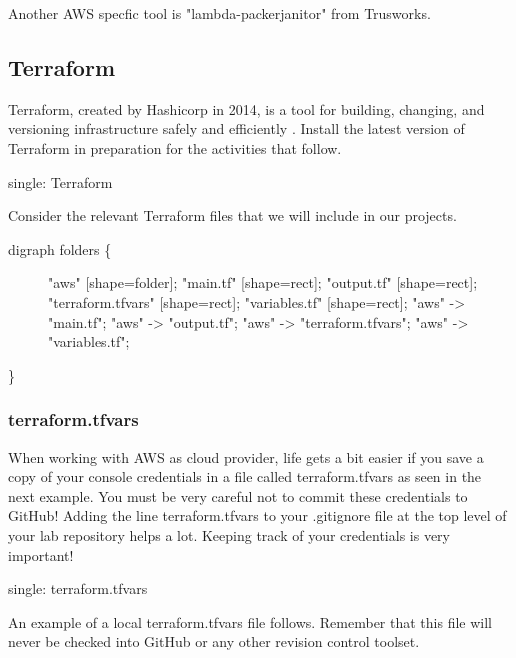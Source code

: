 Another AWS specfic tool is "lambda-packerjanitor" from Trusworks.

\hypertarget{terraform}{%
   \subsection{Terraform}\label{terraform}}

Terraform, created by Hashicorp in 2014, is a tool for building,
changing, and versioning infrastructure safely and efficiently . Install
the latest version of Terraform in preparation for the activities that
follow.

single: Terraform

Consider the relevant Terraform files that we will include in our
projects.

\begin{description}
   \item[digraph folders \{]
         "aws" {[}shape=folder{]}; "main.tf" {[}shape=rect{]}; "output.tf"
         {[}shape=rect{]}; "terraform.tfvars" {[}shape=rect{]}; "variables.tf"
         {[}shape=rect{]}; "aws" -\textgreater{} "main.tf"; "aws" -\textgreater{}
         "output.tf"; "aws" -\textgreater{} "terraform.tfvars"; "aws"
         -\textgreater{} "variables.tf";
\end{description}

\}

\hypertarget{terraform.tfvars}{%
   \subsubsection{terraform.tfvars}\label{terraform.tfvars}}

When working with AWS as cloud provider, life gets a bit easier if you
save a copy of your console credentials in a file called
terraform.tfvars as seen in the next example. You must be very careful
not to commit these credentials to GitHub! Adding the line
terraform.tfvars to your .gitignore file at the top level of your lab
repository helps a lot. Keeping track of your credentials is very
important!

single: terraform.tfvars

An example of a local terraform.tfvars file follows. Remember that this
file will never be checked into GitHub or any other revision control
toolset.

\begin{Shaded}
   \begin{Highlighting}[]
   \end{Highlighting}
\end{Shaded}

